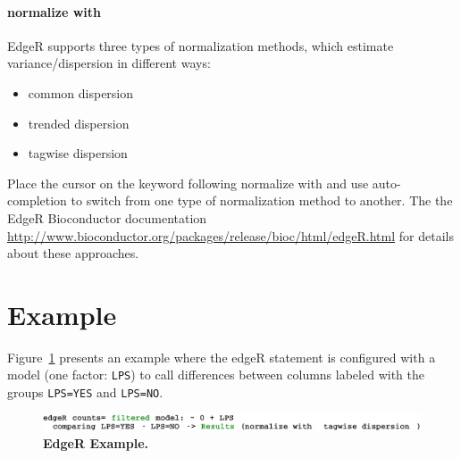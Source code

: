 \paragraph{normalize with}

EdgeR supports three types of normalization methods, which estimate variance/dispersion in different ways:

\begin{itemize}
  \item common dispersion 
  \item trended dispersion
  \item tagwise dispersion
\end{itemize}

Place the cursor on the keyword following normalize with and use auto-completion to switch from one type of normalization method to another. The the EdgeR Bioconductor documentation \url{http://www.bioconductor.org/packages/release/bioc/html/edgeR.html} for details about these approaches.

\section{Example}
Figure~\ref{fig:EdgeRExample} presents an example where the edgeR statement is configured with a model (one factor: \texttt{LPS}) to call differences between columns labeled with the groups \texttt{LPS=YES} and \texttt{LPS=NO}.

\begin{figure}[h!tbp]
  \centering
  \includegraphics[width=\figWidthWide]{figures/EdgeRExample.pdf}
\caption[EdgeR Example.]{\textbf{EdgeR Example.}}
\label{fig:EdgeRExample}
\end{figure}
